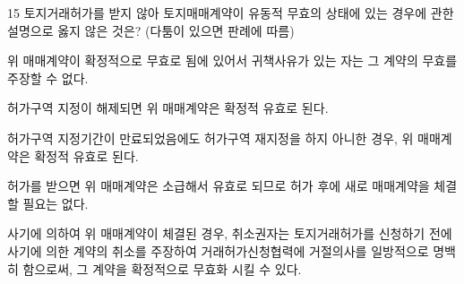 \begin{question}{15}
토지거래허가를 받지 않아 토지매매계약이 유동적 무효의 상태에 있는 경우에 관한 설명으로 옳지 않은 것은? (다툼이 있으면 판례에 따름)
\begin{choices}
  \item 위 매매계약이 확정적으로 무효로 됨에 있어서 귀책사유가 있는 자는 그 계약의 무효를 주장할 수 없다.
  \item 허가구역 지정이 해제되면 위 매매계약은 확정적 유효로 된다.
  \item 허가구역 지정기간이 만료되었음에도 허가구역 재지정을 하지 아니한 경우, 위 매매계약은 확정적 유효로 된다.
  \item 허가를 받으면 위 매매계약은 소급해서 유효로 되므로 허가 후에 새로 매매계약을 체결할 필요는 없다.
  \item 사기에 의하여 위 매매계약이 체결된 경우, 취소권자는 토지거래허가를 신청하기 전에 사기에 의한 계약의 취소를 주장하여 거래허가신청협력에 거절의사를 일방적으로 명백히 함으로써, 그 계약을 확정적으로 무효화 시킬 수 있다.
\end{choices}
\end{question}
